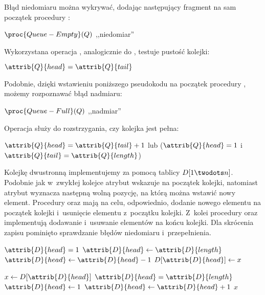 \exercise %
Błąd niedomiaru można wykrywać, dodając następujący fragment na sam początek procedury :
\begin{codebox}
\zi	\If $\proc{Queue-Empty}(Q)$
\zi		\Then \Error ,,niedomiar''
		\End
\end{codebox}
Wykorzystana operacja , analogicznie do , testuje pustość kolejki:
\begin{codebox}
\li	\If $\attrib{Q}{head}=\attrib{Q}{tail}$
\li		\Then \Return {}
\li		\Else \Return {}
\End
\end{codebox}

Podobnie, dzięki wstawieniu poniższego pseudokodu na początek procedury , możemy rozpoznawać błąd nadmiaru:
\begin{codebox}
\zi	\If $\proc{Queue-Full}(Q)$
\zi		\Then \Error ,,nadmiar''
		\End
\end{codebox}
Operacja  służy do rozstrzygania, czy kolejka jest pełna:
\begin{codebox}
\li	\If $\attrib{Q}{head}=\attrib{Q}{tail}+1$ lub ($\attrib{Q}{head}=1$ i~$\attrib{Q}{tail}=\attrib{Q}{length}$)
\li		\Then \Return {}
\li		\Else \Return {}
\End
\end{codebox}

\exercise %
Kolejkę dwustronną implementujemy za pomocą tablicy $D[1\twodots n]$.
Podobnie jak w~zwykłej kolejce atrybut  wskazuje na początek kolejki, natomiast atrybut  wyznacza następną wolną pozycję, na którą można wstawić nowy element.
Procedury  oraz  mają na celu, odpowiednio, dodanie nowego elementu na początek kolejki i~usunięcie elementu z~początku kolejki.
Z~kolei procedury  oraz  implementują dodawanie i~usuwanie elementów na końcu kolejki.
Dla skrócenia zapisu pominięto sprawdzanie błędów niedomiaru i~przepełnienia.

\begin{codebox}
\li	\If $\attrib{D}{head}=1$
\li		\Then $\attrib{D}{head}\gets\attrib{D}{length}$
\li		\Else $\attrib{D}{head}\gets\attrib{D}{head}-1$
		\End
\li	$D[\attrib{D}{head}]\gets x$
\end{codebox}

\begin{codebox}
\li	$x\gets D[\attrib{D}{head}]$
\li	\If $\attrib{D}{head}=\attrib{D}{length}$
\li		\Then $\attrib{D}{head}\gets1$
\li		\Else $\attrib{D}{head}\gets\attrib{D}{head}+1$
		\End
\li	\Return $x$
\end{codebox}

